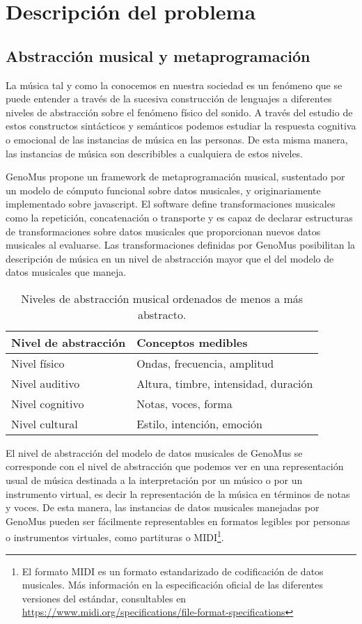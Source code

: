\chapter{Descripción del problema}\label{cap:descripcion}

\section{Abstracción musical y metaprogramación}

La música tal y como la conocemos en nuestra sociedad es un fenómeno que se puede entender a través de la sucesiva construcción de lenguajes a diferentes niveles de abstracción sobre el fenómeno físico del sonido. A través del estudio de estos constructos sintácticos y semánticos podemos estudiar la respuesta cognitiva o emocional de las instancias de música en las personas. De esta misma manera, las instancias de música son describibles a cualquiera de estos niveles.

GenoMus propone un framework de metaprogramación musical, sustentado por un modelo de cómputo funcional sobre datos musicales, y originariamente implementado sobre javascript. El software define transformaciones musicales como la repetición, concatenación o transporte y es capaz de declarar estructuras de transformaciones sobre datos musicales que proporcionan nuevos datos musicales al evaluarse. Las transformaciones definidas por GenoMus posibilitan la descripción de música en un nivel de abstracción mayor que el del modelo de datos musicales que maneja.

\begin{table}[]
    \centering
    \begin{tabular}{l | l}
        \textbf{Nivel de abstracción} & \textbf{Conceptos medibles} \\ \hline \hline
        Nivel físico & Ondas, frecuencia, amplitud \\
        Nivel auditivo & Altura, timbre, intensidad, duración \\
        Nivel cognitivo & Notas, voces, forma \\
        Nivel cultural & Estilo, intención, emoción
    \end{tabular}
    \caption{Niveles de abstracción musical ordenados de menos a más abstracto.}
    \label{tab:abstraccion_musical}
\end{table}

El nivel de abstracción del modelo de datos musicales de GenoMus se corresponde con el nivel de abstracción que podemos ver en una representación usual de música destinada a la interpretación por un músico o por un instrumento virtual, es decir la representación de la música en términos de notas y voces. De esta manera, las instancias de datos musicales manejadas por GenoMus pueden ser fácilmente representables en formatos legibles por personas o instrumentos virtuales, como partituras o MIDI\footnote{El formato MIDI es un formato estandarizado de codificación de datos musicales. Más información en la especificación oficial de las diferentes versiones del estándar, consultables en \url{https://www.midi.org/specifications/file-format-specifications}}.

